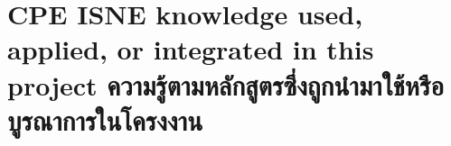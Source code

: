 







\section{\ifenglish%
\ifcpe CPE \else ISNE \fi knowledge used, applied, or integrated in this project
\else%
ความรู้ตามหลักสูตรซึ่งถูกนำมาใช้หรือบูรณาการในโครงงาน
\fi
}

